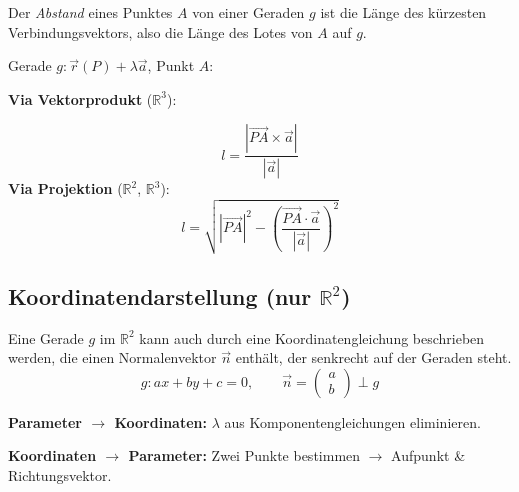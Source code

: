 Der \emph{Abstand} eines Punktes $A$ von einer Geraden $g$ ist die Länge des kürzesten Verbindungsvektors, also die Länge des Lotes von $A$ auf $g$.

Gerade $g\colon \vec r(P) + \lambda\vec a$, Punkt $A$:

\textbf{Via Vektorprodukt} ($\mathbb{R}^3$):

\[
    l = \dfrac{|\overrightarrow{PA} \times \vec a|}{|\vec a|}
\]
\textbf{Via Projektion} ($\mathbb{R}^2$, $\mathbb{R}^3$):
\[
    l = \sqrt{|\overrightarrow{PA}|^2 - \left(\dfrac{\overrightarrow{PA}\cdot\vec a}{|\vec a|}\right)^{\!2}}
\]

\subsection{Koordinatendarstellung (nur $\mathbb{R}^2$)}
Eine Gerade $g$ im $\mathbb{R}^2$ kann auch durch eine Koordinatengleichung beschrieben werden, die einen Normalenvektor $\vec n$ enthält, der senkrecht auf der Geraden steht.
\[
    g\colon ax + by + c = 0, \qquad \vec n = \begin{pmatrix} a \\ b \end{pmatrix} \perp g
\]

\textbf{Parameter $\to$ Koordinaten:} $\lambda$ aus Komponentengleichungen eliminieren.

\textbf{Koordinaten $\to$ Parameter:} Zwei Punkte bestimmen $\to$ Aufpunkt \& Richtungsvektor.